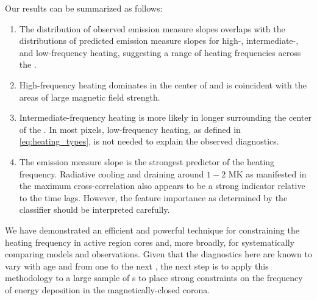 Our results can be summarized as follows:
\begin{enumerate}
    \item The distribution of observed emission measure slopes overlaps with the distributions of predicted emission measure slopes for high-, intermediate-, and low-frequency heating, suggesting a range of heating frequencies across the \AR{}.
    \item High-frequency heating dominates in the center of \AR{} and is coincident with the areas of large magnetic field strength.
    \item Intermediate-frequency heating is more likely in longer  surrounding the center of the \AR{}. In most pixels, low-frequency heating, as defined in \autoref{eq:heating_types}, is not needed to explain the observed diagnostics.
    \item The emission measure slope is the strongest predictor of the heating frequency. Radiative cooling and draining around $1-2$ MK as manifested in the maximum cross-correlation also appears to be a strong indicator relative to the time lags. However, the feature importance as determined by the classifier should be interpreted carefully.
\end{enumerate}

We have demonstrated an efficient and powerful technique for constraining the heating frequency in active region cores and, more broadly, for systematically comparing models and observations.
Given that the diagnostics here are known to vary with age \citep[e.g.][]{schmelz_cold_2012,del_zanna_evolution_2015} and from one \AR{} to the next \citep{warren_systematic_2012,viall_survey_2017}, the next step is to apply this methodology to a large sample of \AR s to place strong constraints on the frequency of energy deposition in the magnetically-closed corona.
